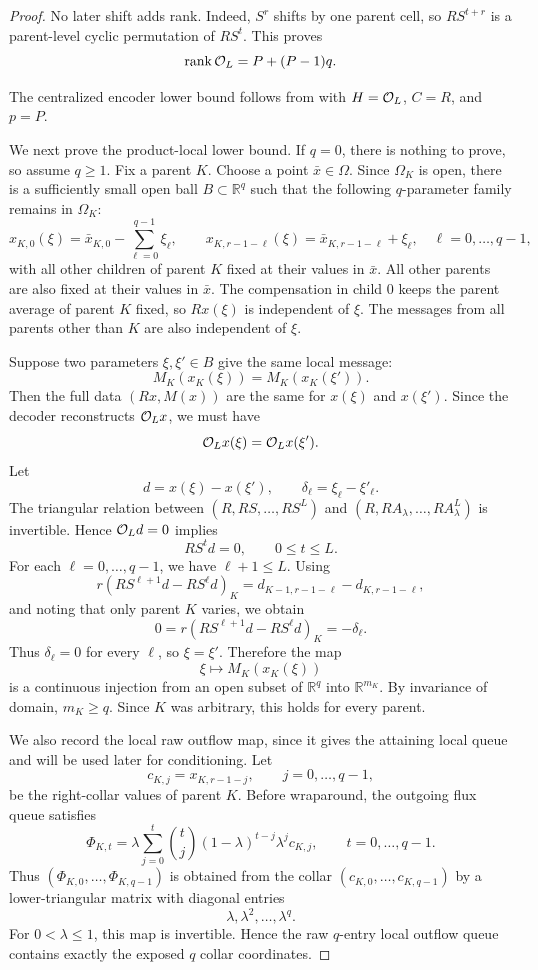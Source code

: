 \documentclass[preprint,12pt]{elsarticle}
\theoremstyle{plain}
\theoremstyle{remark}
\theoremstyle{definition}
\DeclareMathOperator{\rank}{rank}
\begin{document}
\begin{proof}
No later shift adds rank.  Indeed, \(S^r\) shifts by one parent cell, so
\(RS^{t+r}\) is a parent-level cyclic permutation of \(RS^t\).  This proves
\[
  \rank{\cal O}_L=P+(P-1)q.
\]

The centralized encoder lower bound follows from  with
\(H={\cal O}_L\), \(C=R\), and \(p=P\).

We next prove the product-local lower bound.  If \(q=0\), there is nothing
to prove, so assume \(q\ge1\).  Fix a parent \(K\).  Choose a point
\(\bar x\in\Omega\).  Since \(\Omega_K\) is open, there is a sufficiently
small open ball \(B\subset\mathbb R^q\) such that the following
\(q\)-parameter family remains in \(\Omega_K\):
\[
  x_{K,0}(\xi)
  =
  \bar x_{K,0}
  -
  \sum_{\ell=0}^{q-1}\xi_\ell,
  \qquad
  x_{K,r-1-\ell}(\xi)
  =
  \bar x_{K,r-1-\ell}
  +
  \xi_\ell,
  \quad
  \ell=0,\ldots,q-1,
\]
with all other children of parent \(K\) fixed at their values in \(\bar x\).
All other parents are also fixed at their values in \(\bar x\).  The
compensation in child \(0\) keeps the parent average of parent \(K\) fixed,
so \(Rx(\xi)\) is independent of \(\xi\).  The messages from all parents
other than \(K\) are also independent of \(\xi\).

Suppose two parameters \(\xi,\xi'\in B\) give the same local message:
\[
  M_K(x_K(\xi))=M_K(x_K(\xi')).
\]
Then the full data \((Rx,M(x))\) are the same for \(x(\xi)\) and
\(x(\xi')\).  Since the decoder reconstructs \({\cal O}_Lx\), we must have
\[
  {\cal O}_L x(\xi)={\cal O}_L x(\xi').
\]
Let
\[
  d=x(\xi)-x(\xi'),
  \qquad
  \delta_\ell=\xi_\ell-\xi'_\ell.
\]
The triangular relation between
\((R,RS,\ldots,RS^L)\) and
\((R,RA_\lambda,\ldots,RA_\lambda^L)\) is invertible.  Hence
\({\cal O}_Ld=0\) implies
\[
  RS^t d=0,
  \qquad
  0\le t\le L.
\]
For each \(\ell=0,\ldots,q-1\), we have \(\ell+1\le L\).  Using
\[
  r(RS^{\ell+1}d-RS^\ell d)_K
  =
  d_{K-1,r-1-\ell}-d_{K,r-1-\ell},
\]
and noting that only parent \(K\) varies, we obtain
\[
  0
  =
  r(RS^{\ell+1}d-RS^\ell d)_K
  =
  -\delta_\ell.
\]
Thus \(\delta_\ell=0\) for every \(\ell\), so \(\xi=\xi'\).  Therefore the
map
\[
  \xi\mapsto M_K(x_K(\xi))
\]
is a continuous injection from an open subset of \(\mathbb R^q\) into
\(\mathbb R^{m_K}\).  By invariance of domain, \(m_K\ge q\).  Since \(K\) was
arbitrary, this holds for every parent.

We also record the local raw outflow map, since it gives the attaining local
queue and will be used later for conditioning.  Let
\[
  c_{K,j}=x_{K,r-1-j},
  \qquad
  j=0,\ldots,q-1,
\]
be the right-collar values of parent \(K\).  Before wraparound, the outgoing
flux queue satisfies
\[
  \Phi_{K,t}
  =
  \lambda
  \sum_{j=0}^{t}
  \binom{t}{j}
  (1-\lambda)^{t-j}\lambda^j c_{K,j},
  \qquad
  t=0,\ldots,q-1.
\]
Thus \((\Phi_{K,0},\ldots,\Phi_{K,q-1})\) is obtained from the collar
\((c_{K,0},\ldots,c_{K,q-1})\) by a lower-triangular matrix with diagonal
entries
\[
  \lambda,\lambda^2,\ldots,\lambda^q.
\]
For \(0<\lambda\le1\), this map is invertible.  Hence the raw \(q\)-entry
local outflow queue contains exactly the exposed \(q\) collar coordinates.


\end{proof}
\end{document}
